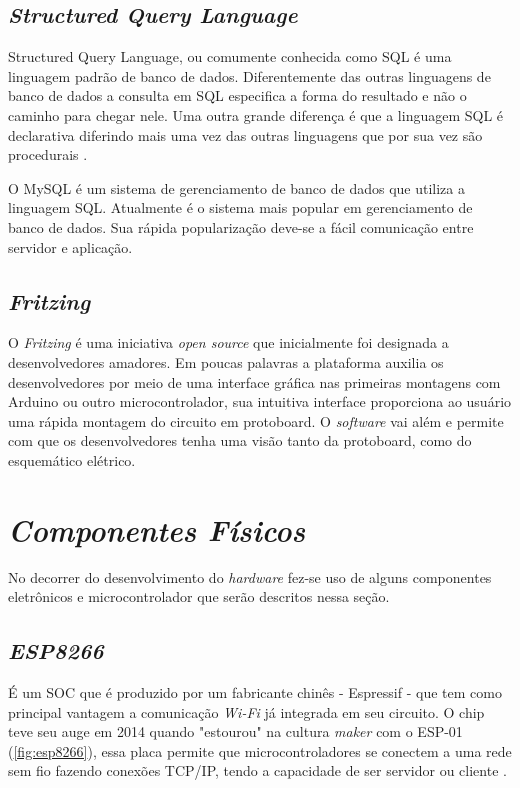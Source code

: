 \subsection[\textit{Structured Query Language}]{\textit{Structured Query Language}}\label{sql}
Structured Query Language, ou comumente conhecida como SQL é uma linguagem padrão de banco de dados. 
Diferentemente das outras linguagens de banco de dados a consulta em SQL especifica a forma do resultado e não o caminho para chegar nele. Uma outra
grande diferença é que a linguagem SQL é declarativa diferindo mais uma vez das outras linguagens que por sua vez são procedurais \cite{ref-sqlhisto}.

O MySQL é um sistema de gerenciamento de banco de dados que utiliza a linguagem SQL. Atualmente é o sistema mais popular em gerenciamento de 
banco de dados. Sua rápida popularização deve-se a fácil comunicação entre servidor e aplicação.

\subsection[\textit{Fritzing}]{\textit{Fritzing}}\label{fritzing}
O \textit{Fritzing} é uma iniciativa \textit{open source} que inicialmente foi
designada a desenvolvedores amadores. Em poucas palavras
a plataforma auxilia os desenvolvedores por meio de uma interface gráfica nas primeiras montagens com Arduino
ou outro microcontrolador, sua intuitiva interface proporciona ao usuário uma rápida montagem do circuito em protoboard. O \textit{software} vai além
e permite com que os desenvolvedores tenha uma visão tanto da protoboard, como do esquemático elétrico. 


\section[\textit{Componentes Físicos}]{\textit{Componentes Físicos}}\label{comp-fisico}
No decorrer do desenvolvimento do \textit{hardware} fez-se uso de alguns componentes eletrônicos e microcontrolador que serão descritos nessa seção.
\subsection[\textit{ESP8266}]{\textit{ESP8266}}\label{esp}
É um SOC que é produzido por um fabricante chinês - Espressif - que tem como principal vantagem a comunicação \textit{Wi-Fi} já integrada em seu circuito.
O chip teve seu auge em 2014 quando "estourou" na cultura \textit{maker} com o ESP-01 (\autoref{fig:esp8266}), essa placa permite que microcontroladores se conectem a uma rede
sem fio  fazendo conexões TCP/IP, tendo a capacidade de ser servidor ou cliente \cite{ref-esp8266h}.

